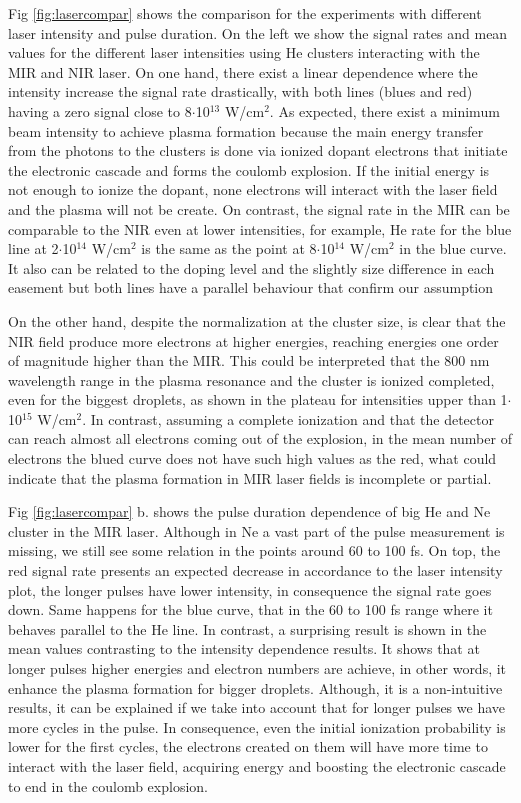 Fig \ref{fig:lasercompar} shows the comparison for the experiments with different laser intensity and pulse duration. On the left we show the signal rates and mean values for the different laser intensities using He clusters interacting with the MIR and NIR laser. On one hand, there exist a linear dependence where the intensity increase the signal rate drastically, with both lines (blues and red) having a zero signal close to 8$\cdot$10$^{13}$ W/cm$^{2}$. As expected, there exist a minimum beam intensity to achieve plasma formation because the main energy transfer from the photons to the clusters is done via ionized dopant electrons that initiate the electronic cascade and forms the coulomb explosion. If the initial energy is not enough to ionize the dopant, none electrons will interact with the laser field and the plasma will not be create. On contrast, the signal rate in the MIR can be comparable to the NIR even at lower intensities, for example, He rate for the blue line at 2$\cdot$10$^{14}$ W/cm$^{2}$ is the same as the point at 8$\cdot$10$^{14}$ W/cm$^{2}$ in the blue curve. It also can be related to the doping level and the slightly size difference in each easement but both lines have a parallel behaviour that confirm our assumption 

On the other hand, despite the normalization at the cluster size, is clear that the NIR field produce more electrons at higher energies, reaching energies one order of magnitude higher than the MIR.  This could be interpreted that the 800 nm wavelength range in the plasma resonance and the cluster is ionized completed, even for the biggest droplets, as shown in the plateau for intensities upper than 1$\cdot$10$^{15}$ W/cm$^{2}$. In contrast, assuming a complete ionization and that the detector can reach almost all electrons coming out of the explosion, in the mean number of electrons the blued curve does not have such high values as the red, what could indicate that the plasma formation in MIR laser fields is incomplete or partial. 

Fig \ref{fig:lasercompar} b. shows the pulse duration dependence of big He and Ne cluster in the MIR laser. Although in Ne a vast part of the pulse measurement is missing, we still see some relation in the points around 60 to 100 fs. On top, the red signal rate presents an expected decrease in accordance to the laser intensity plot, the longer pulses have lower intensity, in consequence the signal rate goes down. Same happens for the blue curve, that in the 60 to 100 fs  range where it behaves parallel to the He line.
In contrast, a surprising result is shown in the mean values contrasting to the intensity dependence results. It shows that at longer pulses higher energies and electron numbers are achieve, in other words, it enhance the plasma formation for bigger droplets. Although, it is a non-intuitive results, it can be explained if we take into account that for longer pulses we have more cycles in the pulse. In consequence, even the initial ionization probability is lower for the first cycles, the electrons created on them will have more time to interact with the laser field, acquiring energy and boosting the electronic cascade to end in the coulomb explosion.

